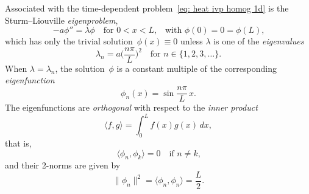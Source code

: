 Associated with the time-dependent problem~\eqref{eq: heat ivp homog 1d} is the 
Sturm--Liouville \emph{eigenproblem},
\begin{equation}\label{eq: simple eigenproblem}
-a\phi''=\lambda\phi\quad\text{for $0<x<L$,}
	\quad\text{with $\phi(0)=0=\phi(L)$,}
\end{equation}
which has only the trivial solution~$\phi(x)\equiv0$ unless $\lambda$ is one of 
the \emph{eigenvalues} 
\[
\lambda_n=a\biggl(\frac{n\pi}{L}\biggr)^2\quad\text{for $n\in\{1,2,3,\ldots\}$.}
\]
When $\lambda=\lambda_n$, the solution~$\phi$ is a constant multiple of the 
corresponding \emph{eigenfunction}
\[
\phi_n(x)=\sin\frac{n\pi}{L}\,x.
\]
The eigenfunctions are \emph{orthogonal} with respect to the 
\emph{inner product}
\[
\langle f,g\rangle=\int_0^Lf(x)g(x)\,dx,
\]
that is,
\[
\langle\phi_n,\phi_k\rangle=0\quad\text{if $n\ne k$,}
\]
and their 2-norms are given by
\[
\|\phi_n\|^2=\langle\phi_n,\phi_n\rangle=\frac{L}{2}.
\]

